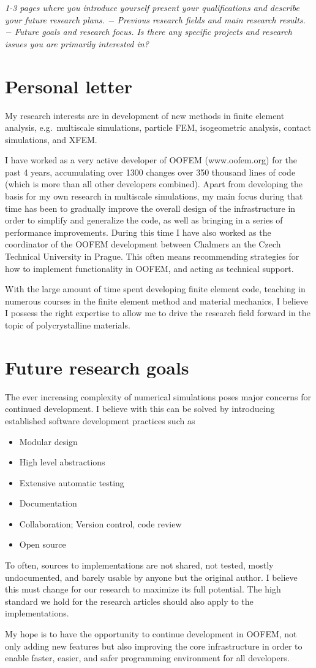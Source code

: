 \documentclass{article}
\begin{document}
\textit{
1-3 pages where you introduce yourself present your qualifications and describe your future research plans.
− Previous research fields and main research results.
− Future goals and research focus. Is there any specific projects and research issues you are primarily interested in?
}


\section{Personal letter}
My research interests are in development of new methods in finite element analysis, e.g.\ multiscale simulations, particle FEM, isogeometric analysis, contact simulations, and XFEM.

I have worked as a very active developer of OOFEM (www.oofem.org) for the past 4 years, accumulating over 1300 changes over 350 thousand lines of code (which is more than all other developers combined).
Apart from developing the basis for my own research in multiscale simulations, my main focus during that time has been to gradually improve the overall design of the infrastructure in order to simplify and generalize the code, as well as bringing in a series of performance improvements.
During this time I have also worked as the coordinator of the OOFEM development between Chalmers an the Czech Technical University in Prague.
This often means recommending strategies for how to implement functionality in OOFEM, and acting as technical support.

With the large amount of time spent developing finite element code, teaching in numerous courses in the finite element method and material mechanics, I believe I possess the right expertise to allow me to drive the research field forward in the topic of polycrystalline materials.

\section{Future research goals}
The ever increasing complexity of numerical simulations poses major concerns for continued development.
I believe with this can be solved by introducing established software development practices such as
\begin{itemize}
 \item Modular design
 \item High level abstractions
 \item Extensive automatic testing
 \item Documentation
 \item Collaboration; Version control, code review
 \item Open source
\end{itemize}
To often, sources to implementations are not shared, not tested, mostly undocumented, and barely usable by anyone but the original author.
I believe this must change for our research to maximize its full potential.
The high standard we hold for the research articles should also apply to the implementations.


My hope is to have the opportunity to continue development in OOFEM, not only adding new features but also improving the core infrastructure in order to enable faster, easier, and safer programming environment for all developers.
\end{document}
